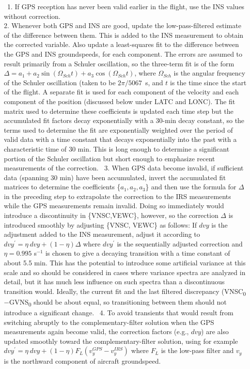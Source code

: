 \documentclass[
  english,
]{book}
\begin{document}
~1. If GPS reception has never been valid earlier in the flight, use the
INS values without correction.\\
\hspace*{0.333em}2. Whenever both GPS and INS are good, update the
low-pass-filtered estimate of the difference between them. This is added
to the INS measurement to obtain the corrected variable. Also update a
least-squares fit to the difference between the GPS and INS
groundspeeds, for each component. The errors are assumed to result
primarily from a Schuler oscillation, so the three-term fit is of the
form \(\Delta=a_1+a_2\sin(\Omega_{Sch}t)+a_3\cos(\Omega_{Sch}t)\), where
\(\Omega_{Sch}\) is the angular frequency of the Schuler oscillation
(taken to be \(2\pi/5067\)~s, and \(t\) is the time since the start of
the flight. A separate fit is used for each component of the velocity
and each component of the position (discussed below under LATC and
LONC). The \protect\hypertarget{fit-matrix}{}{fit matrix} used to
determine these coefficients is updated each time step but the
accumulated fit factors decay exponentially with a 30-min decay
constant, so the terms used to determine the fit are exponentially
weighted over the period of valid data with a time constant that decays
exponentially into the past with a characteristic time of 30 min. This
is long enough to determine a significant portion of the Schuler
oscillation but short enough to emphasize recent measurements of the
correction. ~3. When GPS data become invalid, if sufficient data
(spanning 30 min) have been accumulated, invert the accumulated fit
matrices to determine the coefficients \{\(a_1,a_2,a_3\)\} and then use
the formula for \(\Delta\) in the preceding step to extrapolate the
correction to the IRS measurements while the GPS measurements remain
invalid. Doing so immediately would introduce a discontinuity in
\{VNSC,VEWC\}, however, so the correction \(\Delta\) is introduced
smoothly by adjusting \{VNSC, VEWC\} as follows: If \(dvy\) is the
adjustment added to the INS measurement, adjust it according to
\(dvy^\prime=\eta\ dvy+(1-\eta)\Delta\) where \(dvy^\prime\) is the
sequentially adjusted correction and \(\eta=0.995\) s\(^{-1}\) is chosen
to give a decaying transition with a time constant of about 5.5 min.
This has the potential to introduce some artificial variance at this
scale and so should be considered in cases where variance spectra are
analyzed in detail, but it has much less influence on such spectra than
a discontinuous transition would. Ideally, the current fit and the last
filtered discrepancy (VNSC\textsubscript{0}\(-\)GVNS\textsubscript{0}
should be about equal, so transitioning between them should not
introduce a significant change. ~4. To avoid transients that would
result from switching abruptly to the complementary-filter solution when
the GPS measurements again become valid, the correction factors (e.g.,
\(dvy\)) are also updated smoothly toward the complementary-filter
solution, using for example
\(dvy^\prime=\eta\ dvy+(1-\eta)F_L(v_y^{GPS}-v_y^{IRS})\) where \(F_L\)
is the low-pass filter and \(v_y\) is the northward component of
aircraft groundspeed.
\end{document}
